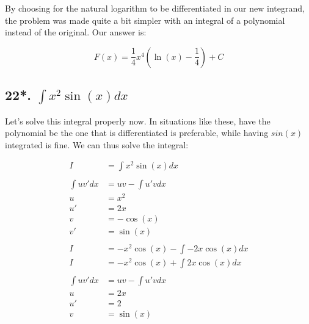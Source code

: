 \documentclass[12pt]{article}
\begin{document}
By choosing for the natural logarithm to be differentiated in our new integrand, the problem was made quite a bit simpler with an integral of a polynomial instead of the original.
Our answer is:

$$
    F(x) = \frac{1}{4}x^4\left(\ln(x) - \frac{1}{4}\right) + C
$$

\subsection*{22*. $\int x^2 \sin(x) dx$}

Let's solve this integral properly now.
In situations like these, have the polynomial be the one that is differentiated is preferable, while having $sin(x)$ integrated is fine.
We can thus solve the integral:


\begin{align}
    I           & = \int x^2 \sin(x) dx                                     \\
    \nonumber                                                               \\
    \int uv' dx & = uv - \int u'v dx                                        \\
    u           & = x^2                                                     \\
    u'          & = 2x                                                      \\
    v           & = -\cos(x)                                                \\
    v'          & = \sin(x)                                                 \\
    \nonumber                                                               \\
    I           & = -x^2\cos(x) - \int -2x\cos(x) dx                        \\
    I           & = -x^2\cos(x) + \int 2x\cos(x) dx                         \\
    \nonumber                                                               \\
    \int uv' dx & = uv - \int u'v dx                                        \\
    u           & = 2x                                                      \\
    u'          & = 2                                                       \\
    v           & = \sin(x)                                                 \\

\end{align}
\end{document}
